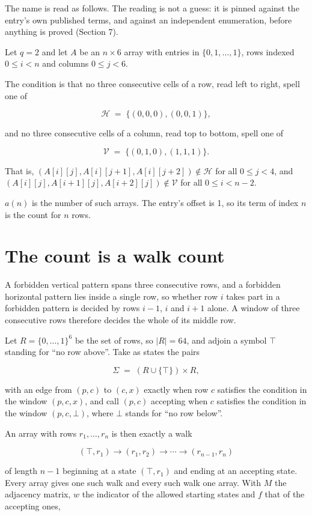 \documentclass[11pt]{article}
\theoremstyle{definition}
\begin{document}
The name is read as follows. The reading is not a guess: it is pinned against the entry's own published terms, and against an independent enumeration, before anything is proved (Section 7).

Let $q = 2$ and let $A$ be an $n \times 6$ array with entries in $\{0,1,\dots,1\}$, rows indexed $0 \le i < n$ and columns $0 \le j < 6$.

The condition is that no three consecutive cells of a row, read left to right, spell one of

\[\mathcal{H} \;=\; \{(0,0,0), (0,0,1)\},\]

and no three consecutive cells of a column, read top to bottom, spell one of

\[\mathcal{V} \;=\; \{(0,1,0), (1,1,1)\}.\]

That is, $(A[i][j],A[i][j{+}1],A[i][j{+}2]) \notin \mathcal{H}$ for all $0 \le j < 4$, and $(A[i][j],A[i{+}1][j],A[i{+}2][j]) \notin \mathcal{V}$ for all $0 \le i < n-2$.

$a(n)$ is the number of such arrays. The entry's offset is 1, so its term of index $n$ is the count for $n$ rows.

\section{The count is a walk count}

A forbidden vertical pattern spans three consecutive rows, and a forbidden horizontal pattern lies inside a single row, so whether row $i$ takes part in a forbidden pattern is decided by rows $i-1$, $i$ and $i+1$ alone. A window of three consecutive rows therefore decides the whole of its middle row.

Let $R = \{0,\dots,1\}^{6}$ be the set of rows, so $|R| = 64$, and adjoin a symbol $\top$ standing for ``no row above''. Take as states the pairs

\[\Sigma \;=\; (R \cup \{\top\}) \times R,\]

with an edge from $(p,c)$ to $(c,x)$ exactly when row $c$ satisfies the condition in the window $(p,c,x)$, and call $(p,c)$ accepting when $c$ satisfies the condition in the window $(p,c,\bot)$, where $\bot$ stands for ``no row below''.

An array with rows $r_1,\dots,r_n$ is then exactly a walk

\[(\top,r_1) \to (r_1,r_2) \to \cdots \to (r_{n-1},r_n)\]

of length $n-1$ beginning at a state $(\top,r_1)$ and ending at an accepting state. Every array gives one such walk and every such walk one array. With $M$ the adjacency matrix, $w$ the indicator of the allowed starting states and $f$ that of the accepting ones,
\end{document}
